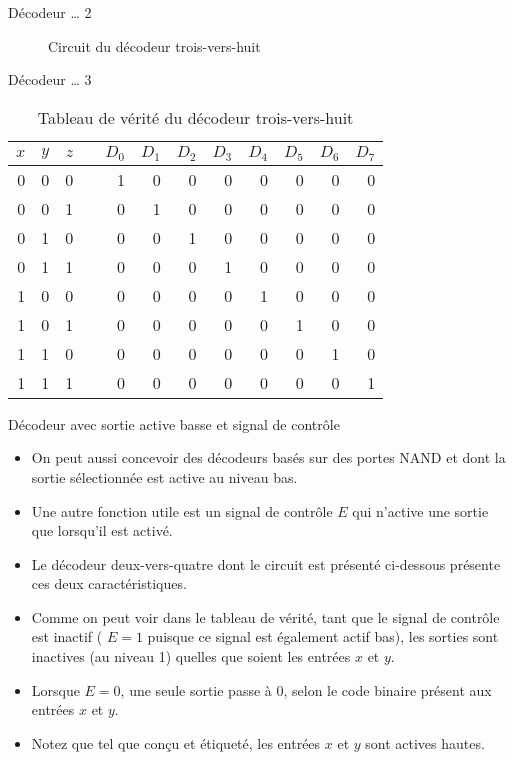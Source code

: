 \documentclass[presentation]{beamer}
\begin{document}
\begin{frame}[label={sec:org9b87085}]{Décodeur \ldots{} 2}
\begin{figure}[htbp]
\centering

\caption{\label{fig:org9275188}Circuit du décodeur trois-vers-huit}
\end{figure}
\end{frame}

\begin{frame}[label={sec:org9d7b39b}]{Décodeur \ldots{} 3}
\begin{table}[htbp]
\caption{\label{tab:orge73f35a}Tableau de vérité du décodeur trois-vers-huit}
\centering
\begin{tabular}{rrrlrrrrrrrr}
\(x\) & \(y\) & \(z\) &  & \(D_0\) & \(D_1\) & \(D_2\) & \(D_3\) & \(D_4\) & \(D_5\) & \(D_6\) & \(D_7\)\\
\hline
0 & 0 & 0 &  & 1 & 0 & 0 & 0 & 0 & 0 & 0 & 0\\
0 & 0 & 1 &  & 0 & 1 & 0 & 0 & 0 & 0 & 0 & 0\\
0 & 1 & 0 &  & 0 & 0 & 1 & 0 & 0 & 0 & 0 & 0\\
0 & 1 & 1 &  & 0 & 0 & 0 & 1 & 0 & 0 & 0 & 0\\
1 & 0 & 0 &  & 0 & 0 & 0 & 0 & 1 & 0 & 0 & 0\\
1 & 0 & 1 &  & 0 & 0 & 0 & 0 & 0 & 1 & 0 & 0\\
1 & 1 & 0 &  & 0 & 0 & 0 & 0 & 0 & 0 & 1 & 0\\
1 & 1 & 1 &  & 0 & 0 & 0 & 0 & 0 & 0 & 0 & 1\\
\end{tabular}
\end{table}
\end{frame}

\begin{frame}[label={sec:org3e5dbed}]{Décodeur avec sortie active basse et signal de contrôle}
\begin{itemize}
\item On peut aussi concevoir des décodeurs basés sur des portes NAND et dont la sortie sélectionnée est active au niveau bas.

\item Une autre fonction utile est un signal de contrôle \(E\) qui n'active une sortie que lorsqu'il est activé.

\item Le décodeur deux-vers-quatre dont le circuit est présenté ci-dessous présente ces deux caractéristiques.

\item Comme on peut voir dans le tableau de vérité, tant que le signal de contrôle est inactif ( \(E = 1\) puisque ce signal est également actif bas), les sorties sont inactives (au niveau 1) quelles que soient les entrées \(x\) et \(y\).

\item Lorsque \(E = 0\), une seule sortie passe à 0, selon le code binaire présent aux entrées \(x\) et \(y\).

\item Notez que tel que conçu et étiqueté, les entrées \(x\) et \(y\) sont actives hautes.
\end{itemize}
\end{frame}
\end{document}
